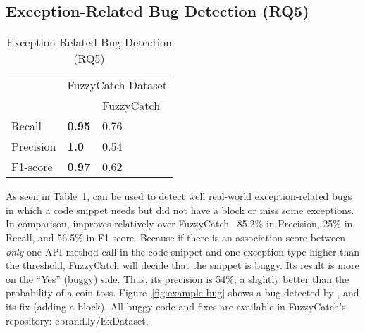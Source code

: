 \subsection{Exception-Related Bug Detection (RQ5)}
\label{sec:rq1}

\begin{table}[t]%
  \caption {Exception-Related Bug Detection (RQ5)}
  \vspace{-12pt}
  \small
	\begin{center}
		\renewcommand{\arraystretch}{1}
		\begin{tabular}{|p{1.75cm}<{\centering}|p{1.75cm}<{\centering}|p{1.75cm}<{\centering}|}
		  \hline
			\multirow{2}{*}{} & \multicolumn{2}{c|}{FuzzyCatch Dataset} \\
			\cline{2-3}
			  & \tool  & FuzzyCatch~\cite{xrank-fse20} \\
			\hline
			Recall    & \textbf{0.95}& 0.76\\
			Precision & \textbf{1.0} & 0.54\\
			F1-score   & \textbf{0.97} & 0.62\\
			\hline
		\end{tabular}
		\label{tab:bug}
	\end{center}
\end{table}



As seen in Table~\ref{tab:bug}, {\tool} can be used to detect well
real-world exception-related bugs in which a code snippet needs but
did not have a  block or miss some exceptions. In
comparison, {\tool} improves relatively over
FuzzyCatch~\cite{xrank-fse20} 85.2\% in Precision, 25\% in Recall, and
56.5\% in F1-score.
Because if there is an association score between {\em only} one API
method call in the code snippet and one exception type higher than the
threshold, FuzzyCatch will decide that the snippet is buggy. Its
result is more on the ``Yes'' (buggy) side. Thus, its precision is
54\%, a slightly better than the probability of a coin
toss. Figure~\ref{fig:example-bug} shows a bug detected by {\tool},
and its fix (adding a  block). All buggy code and
fixes are available in FuzzyCatch's repository: ebrand.ly/ExDataset.




